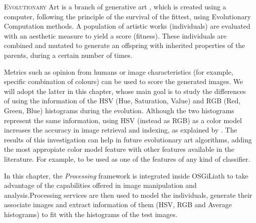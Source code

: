 \label{chap:art}
\minitoc\mtcskip
\vfill
\lettrine{E}{volutionary} Art \cite{EART} is a branch of generative art \cite{PHEROGRAPHY}, which is created using a
computer, following the principle of the survival of the fittest, 
using Evolutionary Computation methods. A population
of artistic works (individuals) are evaluated with an aesthetic
measure to yield a score (fitness). These individuals are combined and
mutated to generate an offspring with inherited properties of the
parents, during a certain number of times. %


Metrics such as opinion from humans or image characteristics (for
example, specific combination of colours) can be used to score the
generated images. We will adopt the latter in this chapter, %
whose main goal is to study the differences %
of using
the information of the HSV (Hue, Saturation, Value) and RGB (Red,
Green, Blue) histograms during the evolution. Although the two
histograms represent the same information, using HSV (instead as RGB)
as a color model increases the accuracy in image retrieval and
indexing, as explained by 
\cite{COLORDIFFERENCES}. The results of this investigation can help in
future evolutionary art algorithms, adding the most appropiate color
model feature with other features available in the literature. For
example, to be used as one of the features of any kind of
classifier. %

In this chapter, the {\em Processing} \cite{PROCESSING} framework is
integrated inside OSGiLiath %
to take advantage of the capabilities offered in image manipulation and analysis.Processing services are then used 
 to model the
individuals, generate their associate images and extract information
of them (HSV, RGB and Average histograms) to fit with the histograms
of the test images.



